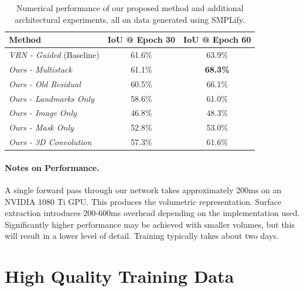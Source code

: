 \begin{table}
  \caption[Numerical performance of human body
  reconstruction]{Numerical performance of our proposed method and
    additional architectural experiments, all on data generated using
    SMPLify.}
  \label{tab:results}
  \centering
  \begin{tabular}{|l||c|c|}
    \hline
    \textbf{Method} & \textbf{IoU @ Epoch 30}  & \textbf{IoU @ Epoch 60} \\
    \hline\hline
    \textit{VRN - Guided}  (Baseline)  & 61.6\% & 63.9\% \\
    \hline
    \textit{Ours - Multistack}         & 61.1\% & \textbf{68.3\%} \\
    \textit{Ours - Old Residual}       & 60.5\% & 66.1\% \\
    \hline
    \textit{Ours - Landmarks Only}     & 58.6\% & 61.0\%  \\
    \textit{Ours - Image Only}         & 46.8\% & 48.3\% \\
    \textit{Ours - Mask Only}          & 52.8\% & 53.0\%\\
    \hline
    \textit{Ours - 3D Convolution}     & 57.3\% & 61.6\%\\

    \hline
\end{tabular}
\end{table}

\paragraph{Notes on Performance.} A single forward pass through our
network takes approximately 200ms on an NVIDIA 1080 Ti GPU. This
produces the volumetric representation. Surface extraction introduces
200-600ms overhead depending on the implementation used. Significantly
higher performance may be achieved with smaller volumes, but this will
result in a lower level of detail. Training typically takes about two
days.




\section{High Quality Training Data}
\label{sec:detailed}

